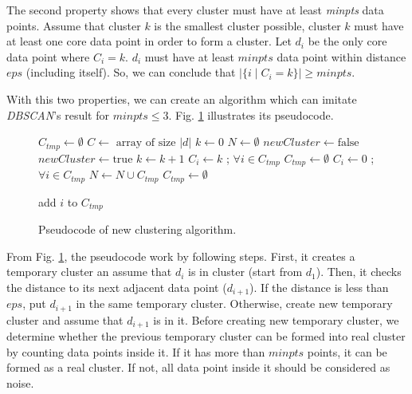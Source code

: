 \documentclass[conference]{IEEEtran}
\begin{document}
The second property shows that every cluster must have at least \textit{minpts} data points. Assume that cluster $k$ is the smallest cluster possible, cluster $k$ must have at least one core data point in order to form a cluster. Let $d_{i}$ be the only core data point where $C_{i} = k$. $d_{i}$ must have at least $\textit{minpts}$ data point within distance $\textit{eps}$ (including itself). So, we can conclude that $|\{i \mid C_{i} = k\}| \ge \textit{minpts}$.

With this two properties, we can create an algorithm which can imitate \textit{DBSCAN}'s result for $\textit{minpts} \le 3$. Fig. \ref{fig:clustering_pseudocode} illustrates its pseudocode.

\begin{figure}
\begin{algorithmic}[1]
	\State $C_{tmp} \gets \emptyset$
	\State $C \gets \text{ array of size } |d|$
	\State $k \gets 0$
	\State $N \gets \emptyset$
		\State $newCluster \gets \text{false}$
			\State $newCluster \gets \text{true}$
		\EndIf
		    \State $k \gets k + 1$			    
			\State $C_{i} \gets k$ ; $\forall i \in C_{tmp}$
			\State $C_{tmp} \gets \emptyset$
			\State $C_{i} \gets 0$ ; $\forall i \in C_{tmp}$			
			\State $N \gets N \cup C_{tmp}$
			\State $C_{tmp} \gets \emptyset$
		\EndIf
		
		\State add $i$ to $C_{tmp}$ 
		
	\EndFor
	\State {}
\EndProcedure	
\end{algorithmic}
\caption{Pseudocode of new clustering algorithm.}
\label{fig:clustering_pseudocode}
\end{figure}

From Fig. \ref{fig:clustering_pseudocode}, the pseudocode work by following steps. First, it creates a temporary cluster an assume that $d_{i}$ is in cluster (start from $d_{1}$). Then, it checks the distance to its next adjacent data point ($d_{i+1}$). If the distance is less than $eps$, put $d_{i+1}$ in the same temporary cluster. Otherwise, create new temporary cluster and assume that $d_{i+1}$ is in it. Before creating new temporary cluster, we determine whether the previous temporary cluster can be formed into real cluster by counting data points inside it. If it has more than $minpts$ points, it can be formed as a real cluster. If not, all data point inside it should be considered as noise.
\end{document}
